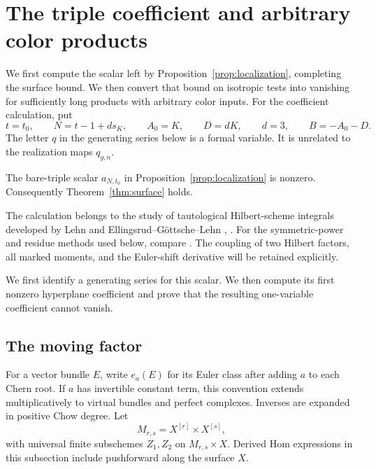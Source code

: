 \section{The triple coefficient and arbitrary color products}
\label{sec:coefficient}

We first compute the scalar left by Proposition~\ref{prop:localization},
completing the surface bound. We then convert that bound on isotropic
tests into vanishing for sufficiently long products with arbitrary color
inputs. For the coefficient calculation, put
\[
 t=t_0,\qquad N=t-1+ds_K,\qquad
 A_0=K,\qquad D=dK,\qquad d=3,
 \qquad B=-A_0-D.
\]
The letter \(q\) in the generating series below is a formal variable.
It is unrelated to the realization maps \(q_{g,n}\).

\begin{proposition}\label{prop:scalar}
The bare-triple scalar \(a_{N,t_0}\) in
Proposition~\ref{prop:localization} is nonzero.
Consequently Theorem~\ref{thm:surface} holds.
\end{proposition}

The calculation belongs to the study of tautological Hilbert-scheme
integrals developed by Lehn and Ellingsrud--G\"ottsche--Lehn
\cite[Section~4.3]{Lehn99}, \cite{EGL}. For the symmetric-power and
residue methods used below, compare
\cite[Equation~(9), Theorem~2, and Lemma~3]{MOPCombinatorics}.
The coupling of two Hilbert factors, all marked moments, and the
Euler-shift derivative will be retained explicitly.

We first identify a generating series for this scalar. We then compute
its first nonzero hyperplane coefficient and prove that the resulting
one-variable coefficient cannot vanish.

\subsection{The moving factor}

For a vector bundle \(E\), write \(e_a(E)\) for its Euler class after
adding \(a\) to each Chern root. If \(a\) has invertible constant term,
this convention extends multiplicatively to virtual bundles and
perfect complexes. Inverses are expanded in positive Chow degree.
Let
\[
 M_{r,s}=X^{[r]}\times X^{[s]},
\]
with universal finite subschemes \(Z_1,Z_2\) on \(M_{r,s}\times X\).
Derived Hom expressions in this subsection include pushforward along
the surface \(X\).

